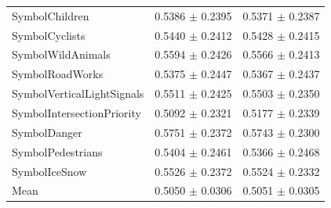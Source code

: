 \begin{longtable}{@{}lrr@{}}
SymbolChildren & 0.5386 $\pm$ 0.2395 & 0.5371 $\pm$ 0.2387 \\
SymbolCyclists & 0.5440 $\pm$ 0.2412 & 0.5428 $\pm$ 0.2415 \\
SymbolWildAnimals & 0.5594 $\pm$ 0.2426 & 0.5566 $\pm$ 0.2413 \\
SymbolRoadWorks & 0.5375 $\pm$ 0.2447 & 0.5367 $\pm$ 0.2437 \\
SymbolVerticalLightSignals & 0.5511 $\pm$ 0.2425 & 0.5503 $\pm$ 0.2350 \\
SymbolIntersectionPriority & 0.5092 $\pm$ 0.2321 & 0.5177 $\pm$ 0.2339 \\
SymbolDanger & 0.5751 $\pm$ 0.2372 & 0.5743 $\pm$ 0.2300 \\
SymbolPedestrians & 0.5404 $\pm$ 0.2461 & 0.5366 $\pm$ 0.2468 \\
SymbolIceSnow & 0.5526 $\pm$ 0.2372 & 0.5524 $\pm$ 0.2332 \\
Mean & 0.5050 $\pm$ 0.0306 & 0.5051 $\pm$ 0.0305 \\
\end{longtable}
